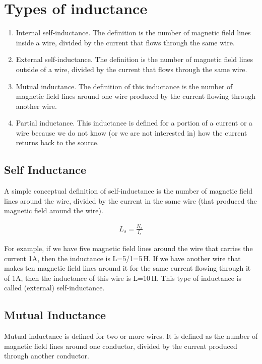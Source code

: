 \documentclass{ximera}
\begin{document}
\section{Types of inductance}

\begin{enumerate}
\item Internal self-inductance. The definition is the number of magnetic field lines inside a wire, divided by the current that flows through the same wire.
\item External self-inductance. The definition is the number of magnetic field lines outside of a wire, divided by the current that flows through the same wire.
\item Mutual inductance. The definition of this inductance is the number of magnetic field lines around one wire produced by the current flowing through another wire.
\item Partial inductance. This inductance is defined for a portion of a current or a wire because we do not know (or we are not interested in) how the current returns back to the source.
\end{enumerate}






\subsection{Self Inductance}


A simple conceptual definition of self-inductance is the number of magnetic field lines around the wire, divided by the current in the same wire (that produced the magnetic field around the wire).
 
 \begin{eqnarray}
 L_s=\frac{N_s}{I_s}
 \end{eqnarray}
 
 For example, if we have five magnetic field lines around the wire that carries the current 1A, then the inductance is L=5/1=5\,H. If we have another wire that makes ten magnetic field lines around it for the same current flowing through it of 1A, then the inductance of this wire is L=10\,H. This type of inductance is called (external) self-inductance. 

\subsection{Mutual Inductance}

Mutual inductance is defined for two or more wires. It is defined as the number of magnetic field lines around one conductor, divided by the current produced through another conductor.
 
\end{document}
